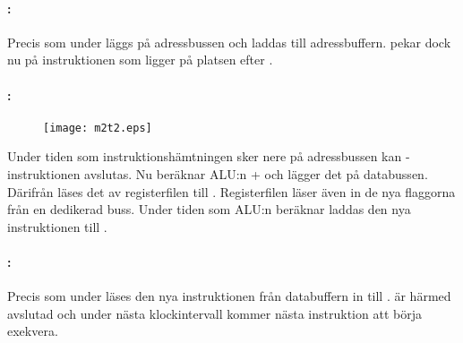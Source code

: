 \documentclass[main.tex]{subfiles}
\newcommand{\diagw}{0.7\textwidth}
\begin{document}
\paragraph{: }
Precis som under  läggs  på adressbussen och laddas till
adressbuffern.  pekar dock nu på instruktionen som ligger på platsen
efter .

\paragraph{: }
\begin{figure}[H]
    \center
    \texttt{[image: m2t2.eps]}
\end{figure}
Under tiden som instruktionshämtningen sker nere på adressbussen kan -instruktionen avslutas. Nu beräknar ALU:n + och lägger det
på databussen. Därifrån läses det av registerfilen till .
Registerfilen läser även in de nya flaggorna från en dedikerad buss. Under
tiden som ALU:n beräknar laddas den nya instruktionen till . 

\paragraph{: }
Precis som under  läses den nya instruktionen från databuffern in
till .  är härmed avslutad och under nästa
klockintervall kommer nästa instruktion att börja exekvera.
\end{document}
